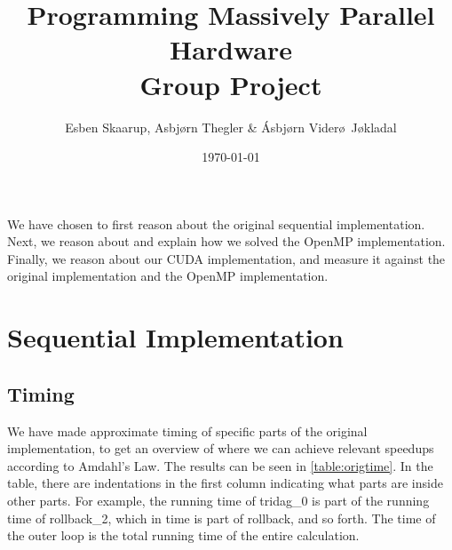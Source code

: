 \documentclass[11pt]{article}
\def\Title{Programming Massively Parallel Hardware\\
\vspace{1.5cm}
\textbf{Group Project}}
\def\Author{Esben Skaarup, Asbj\o rn Thegler \& \'{A}sbj\o rn Vider\o \ J\o kladal}
\begin{document}
\title{\Title}
\author{\Author}
\date{\today}
\maketitle

We have chosen to first reason about the original sequential implementation. 
Next, we reason about and explain how we solved the OpenMP 
implementation. Finally, we reason about our CUDA implementation, and measure
it against the original implementation and the OpenMP implementation.

\section{Sequential Implementation}
\subsection{Timing}
We have made approximate timing of specific parts of the original 
implementation, to get an overview 
of where we can achieve relevant speedups according to Amdahl's Law. The results
can be seen in \autoref{table:origtime}. In the table, there are indentations 
in the first column indicating what parts are inside other parts. For example,
the running time of tridag\_0 is part of the running time of rollback\_2, which
in time is part of rollback, and so forth. The time of the outer loop is the 
total running time of the entire calculation. 
\end{document}
